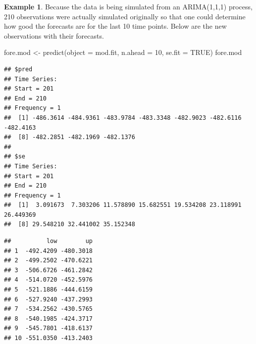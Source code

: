 \documentclass[
]{book}
\newenvironment{Shaded}{\begin{snugshade}}{\end{snugshade}}
\newcommand{\AttributeTok}[1]{\textcolor[rgb]{0.77,0.63,0.00}{#1}}
\newcommand{\CommentTok}[1]{\textcolor[rgb]{0.56,0.35,0.01}{\textit{#1}}}
\newcommand{\ConstantTok}[1]{\textcolor[rgb]{0.00,0.00,0.00}{#1}}
\newcommand{\DecValTok}[1]{\textcolor[rgb]{0.00,0.00,0.81}{#1}}
\newcommand{\FloatTok}[1]{\textcolor[rgb]{0.00,0.00,0.81}{#1}}
\newcommand{\FunctionTok}[1]{\textcolor[rgb]{0.00,0.00,0.00}{#1}}
\newcommand{\NormalTok}[1]{#1}
\newcommand{\OtherTok}[1]{\textcolor[rgb]{0.56,0.35,0.01}{#1}}
\newcommand{\SpecialCharTok}[1]{\textcolor[rgb]{0.00,0.00,0.00}{#1}}
\theoremstyle{definition}
\theoremstyle{definition}
\newtheorem{example}{Example}[chapter]
\theoremstyle{definition}
\theoremstyle{definition}
\theoremstyle{remark}
\begin{document}
\begin{example}
Because the data is being simulated from an ARIMA(1,1,1) process, 210 observations were actually simulated originally so that one could determine how good the forecasts are for the last 10 time points. Below are the new observations with their forecasts.

\begin{Shaded}
\begin{Highlighting}[]
\NormalTok{  fore.mod }\OtherTok{\textless{}{-}} \FunctionTok{predict}\NormalTok{(}\AttributeTok{object =}\NormalTok{ mod.fit, }\AttributeTok{n.ahead =} \DecValTok{10}\NormalTok{, }\AttributeTok{se.fit =} \ConstantTok{TRUE}\NormalTok{)}
\NormalTok{  fore.mod}
\end{Highlighting}
\end{Shaded}

\begin{verbatim}
## $pred
## Time Series:
## Start = 201 
## End = 210 
## Frequency = 1 
##  [1] -486.3614 -484.9361 -483.9784 -483.3348 -482.9023 -482.6116 -482.4163
##  [8] -482.2851 -482.1969 -482.1376
## 
## $se
## Time Series:
## Start = 201 
## End = 210 
## Frequency = 1 
##  [1]  3.091673  7.303206 11.578890 15.682551 19.534208 23.118991 26.449369
##  [8] 29.548210 32.441002 35.152348
\end{verbatim}

\begin{Shaded}
\end{Shaded}

\begin{verbatim}
##          low        up
## 1  -492.4209 -480.3018
## 2  -499.2502 -470.6221
## 3  -506.6726 -461.2842
## 4  -514.0720 -452.5976
## 5  -521.1886 -444.6159
## 6  -527.9240 -437.2993
## 7  -534.2562 -430.5765
## 8  -540.1985 -424.3717
## 9  -545.7801 -418.6137
## 10 -551.0350 -413.2403
\end{verbatim}


\end{example}
\end{document}
